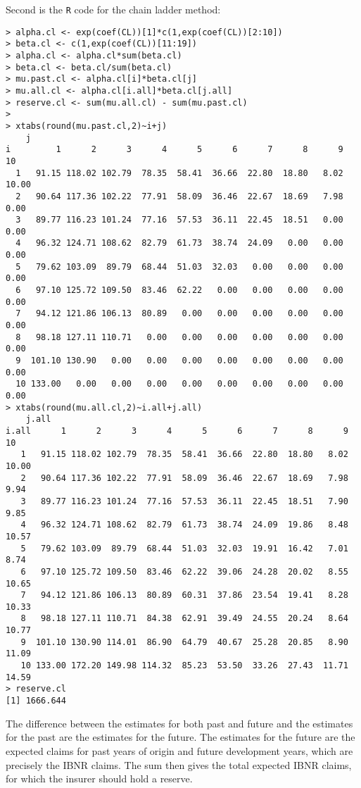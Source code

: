 \documentclass[11pt]{article}
\begin{document}
Second is the \verb|R| code for the chain ladder method:

\begin{verbatim}
> alpha.cl <- exp(coef(CL))[1]*c(1,exp(coef(CL))[2:10])
> beta.cl <- c(1,exp(coef(CL))[11:19])
> alpha.cl <- alpha.cl*sum(beta.cl)
> beta.cl <- beta.cl/sum(beta.cl)
> mu.past.cl <- alpha.cl[i]*beta.cl[j]
> mu.all.cl <- alpha.cl[i.all]*beta.cl[j.all]
> reserve.cl <- sum(mu.all.cl) - sum(mu.past.cl)
> 
> xtabs(round(mu.past.cl,2)~i+j)
    j
i         1      2      3      4      5      6      7      8      9     10
  1   91.15 118.02 102.79  78.35  58.41  36.66  22.80  18.80   8.02  10.00
  2   90.64 117.36 102.22  77.91  58.09  36.46  22.67  18.69   7.98   0.00
  3   89.77 116.23 101.24  77.16  57.53  36.11  22.45  18.51   0.00   0.00
  4   96.32 124.71 108.62  82.79  61.73  38.74  24.09   0.00   0.00   0.00
  5   79.62 103.09  89.79  68.44  51.03  32.03   0.00   0.00   0.00   0.00
  6   97.10 125.72 109.50  83.46  62.22   0.00   0.00   0.00   0.00   0.00
  7   94.12 121.86 106.13  80.89   0.00   0.00   0.00   0.00   0.00   0.00
  8   98.18 127.11 110.71   0.00   0.00   0.00   0.00   0.00   0.00   0.00
  9  101.10 130.90   0.00   0.00   0.00   0.00   0.00   0.00   0.00   0.00
  10 133.00   0.00   0.00   0.00   0.00   0.00   0.00   0.00   0.00   0.00
> xtabs(round(mu.all.cl,2)~i.all+j.all)
    j.all
i.all      1      2      3      4      5      6      7      8      9     10
   1   91.15 118.02 102.79  78.35  58.41  36.66  22.80  18.80   8.02  10.00
   2   90.64 117.36 102.22  77.91  58.09  36.46  22.67  18.69   7.98   9.94
   3   89.77 116.23 101.24  77.16  57.53  36.11  22.45  18.51   7.90   9.85
   4   96.32 124.71 108.62  82.79  61.73  38.74  24.09  19.86   8.48  10.57
   5   79.62 103.09  89.79  68.44  51.03  32.03  19.91  16.42   7.01   8.74
   6   97.10 125.72 109.50  83.46  62.22  39.06  24.28  20.02   8.55  10.65
   7   94.12 121.86 106.13  80.89  60.31  37.86  23.54  19.41   8.28  10.33
   8   98.18 127.11 110.71  84.38  62.91  39.49  24.55  20.24   8.64  10.77
   9  101.10 130.90 114.01  86.90  64.79  40.67  25.28  20.85   8.90  11.09
   10 133.00 172.20 149.98 114.32  85.23  53.50  33.26  27.43  11.71  14.59
> reserve.cl
[1] 1666.644
\end{verbatim}


The difference between the estimates for both past and future and the estimates for the past are the estimates for the future. The estimates for the future are the expected claims for past years of origin and future development years, which are precisely the IBNR claims. The sum then gives the total expected IBNR claims, for which the insurer should hold a reserve.
\end{document}

